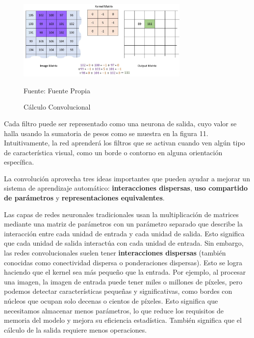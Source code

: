 		\begin{figure}[H]
		\begin{center}
		\includegraphics[width=0.75\textwidth]{images/marcoteorico/Convolution_calculation2}
		\end{center}
		\begin{center}
		\caption{\small{Cálculo Convolucional}}
		{\small{Fuente: Fuente Propia}}
		\end{center}
		\vspace{-1.9em}
		\end{figure}

		Cada filtro puede ser representado como una neurona de salida, cuyo valor se halla usando la sumatoria de pesos como se muestra en la figura 11. Intuitivamente, la red aprenderá los filtros que se activan cuando ven algún tipo de característica visual, como un borde o contorno en alguna orientación específica. 
		
		\vskip 0.4cm  
		
		La convolución aprovecha tres ideas importantes que pueden ayudar a mejorar un sistema de aprendizaje automático: {\bf interacciones dispersas}, {\bf uso compartido de parámetros} y {\bf representaciones equivalentes}.
		
		\vskip 0.4cm  
		Las capas de redes neuronales tradicionales usan la multiplicación de matrices mediante una matriz de parámetros con un parámetro separado que describe la interacción entre cada unidad de entrada y cada unidad de salida. Esto significa que cada unidad de salida interactúa con cada unidad de entrada. Sin embargo, las redes convolucionales suelen tener {\bf interacciones dispersas} (también conocidas como conectividad dispersa o ponderaciones dispersas). Esto se logra haciendo que el kernel sea más pequeño que la entrada. Por ejemplo, al procesar una imagen, la imagen de entrada puede tener miles o millones de píxeles, pero podemos detectar características pequeñas y significativas, como bordes con núcleos que ocupan solo decenas o cientos de píxeles. Esto significa que necesitamos almacenar menos parámetros, lo que reduce los requisitos de memoria del modelo y mejora su eficiencia estadística. También significa que el cálculo de la salida requiere menos operaciones.
		
